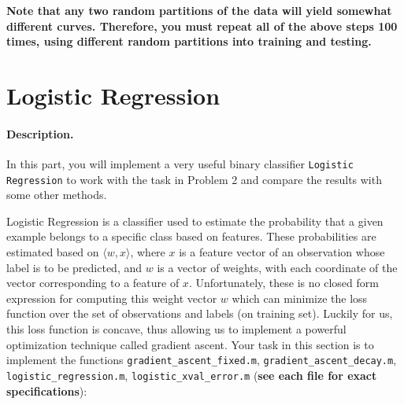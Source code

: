 \documentclass[english]{article}
\begin{document}
 {\bf Note that any two random partitions of the data will yield somewhat different curves. Therefore, you must repeat all of the above steps 100 times, using different random partitions into training and testing.}

\section{Logistic Regression }

\paragraph{Description.} In this part, you will implement a very useful binary classifier {\tt Logistic Regression} to work with the task in Problem 2 and compare the results with some other methods. 


 Logistic Regression is a classifier used to estimate the probability that a given example belongs to a specific class based on features. These probabilities are estimated based on $\langle w,x\rangle$, where $x$ is a feature vector of an observation whose label is to be predicted, and $w$ is a vector of weights, with each coordinate of the vector corresponding to a feature of $x$. Unfortunately, these is no closed form expression for computing this weight vector $w$ which can minimize the loss function over the set of observations and labels (on training set). Luckily for us, this loss function is concave, thus allowing us to implement a powerful optimization technique called gradient ascent. Your task in this section is to implement the functions {\tt gradient\_ascent\_fixed.m}, {\tt gradient\_ascent\_decay.m}, {\tt logistic\_regression.m}, {\tt logistic\_xval\_error.m}
({\bf see each file for exact specifications}):
\end{document}
